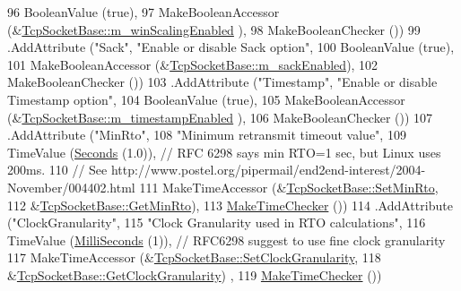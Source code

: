 \begin{DoxyCode}
96                    BooleanValue (\textcolor{keyword}{true}),
97                    MakeBooleanAccessor (&\hyperlink{classns3_1_1TcpSocketBase_a80ff21f228d3334f17dcf56f14fa0c7c}{TcpSocketBase::m\_winScalingEnabled}
      ),
98                    MakeBooleanChecker ())
99     .AddAttribute (\textcolor{stringliteral}{"Sack"}, \textcolor{stringliteral}{"Enable or disable Sack option"},
100                    BooleanValue (\textcolor{keyword}{true}),
101                    MakeBooleanAccessor (&\hyperlink{classns3_1_1TcpSocketBase_af79c709855a362f331251ef73167209a}{TcpSocketBase::m\_sackEnabled}),
102                    MakeBooleanChecker ())
103     .AddAttribute (\textcolor{stringliteral}{"Timestamp"}, \textcolor{stringliteral}{"Enable or disable Timestamp option"},
104                    BooleanValue (\textcolor{keyword}{true}),
105                    MakeBooleanAccessor (&\hyperlink{classns3_1_1TcpSocketBase_a5a7f7e51b07e27a908d4bab44028eee1}{TcpSocketBase::m\_timestampEnabled}
      ),
106                    MakeBooleanChecker ())
107     .AddAttribute (\textcolor{stringliteral}{"MinRto"},
108                    \textcolor{stringliteral}{"Minimum retransmit timeout value"},
109                    TimeValue (\hyperlink{group__timecivil_ga33c34b816f8ff6628e33d5c8e9713b9e}{Seconds} (1.0)), \textcolor{comment}{// RFC 6298 says min RTO=1 sec, but Linux uses 200ms.}
110                    \textcolor{comment}{// See http://www.postel.org/pipermail/end2end-interest/2004-November/004402.html}
111                    MakeTimeAccessor (&\hyperlink{classns3_1_1TcpSocketBase_af99b7fe3341051dead8b4e26a5b2c12b}{TcpSocketBase::SetMinRto},
112                                      &\hyperlink{classns3_1_1TcpSocketBase_a7a2d5935f65b598dba9e2c01506cdbb3}{TcpSocketBase::GetMinRto}),
113                    \hyperlink{group__time_ga7032965bd4afa578691d88c09e4481c1}{MakeTimeChecker} ())
114     .AddAttribute (\textcolor{stringliteral}{"ClockGranularity"},
115                    \textcolor{stringliteral}{"Clock Granularity used in RTO calculations"},
116                    TimeValue (\hyperlink{group__timecivil_gaf26127cf4571146b83a92ee18679c7a9}{MilliSeconds} (1)), \textcolor{comment}{// RFC6298 suggest to use fine clock
       granularity}
117                    MakeTimeAccessor (&\hyperlink{classns3_1_1TcpSocketBase_a9164b842ec64a11e42f5b5e87cb2cecc}{TcpSocketBase::SetClockGranularity},
118                                      &\hyperlink{classns3_1_1TcpSocketBase_a4c47e3add9c7e8023884e0df5a88c489}{TcpSocketBase::GetClockGranularity})
      ,
119                    \hyperlink{group__time_ga7032965bd4afa578691d88c09e4481c1}{MakeTimeChecker} ())

\end{DoxyCode}
